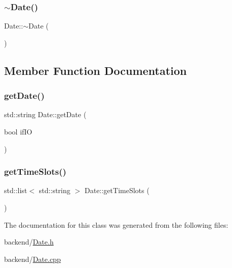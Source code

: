 \mbox{\label{class_date_ade4b469433b7966cc034cbcc6799233b}} 
\subsubsection{\texorpdfstring{$\sim$\+Date()}{~Date()}}
{\footnotesize\ttfamily Date\+::$\sim$\+Date (\begin{DoxyParamCaption}{ }\end{DoxyParamCaption})}



\subsection{Member Function Documentation}
\mbox{\label{class_date_a7de54a65cdd67cf300212b31cdc3d8ee}} 
\subsubsection{\texorpdfstring{get\+Date()}{getDate()}}
{\footnotesize\ttfamily std\+::string Date\+::get\+Date (\begin{DoxyParamCaption}\item[{bool}]{if\+IO }\end{DoxyParamCaption})}

\mbox{\label{class_date_acfcdabd01984684dabbe544163a4b35b}} 
\subsubsection{\texorpdfstring{get\+Time\+Slots()}{getTimeSlots()}}
{\footnotesize\ttfamily std\+::list$<$ std\+::string $>$ Date\+::get\+Time\+Slots (\begin{DoxyParamCaption}{ }\end{DoxyParamCaption})}



The documentation for this class was generated from the following files\+:\begin{DoxyCompactItemize}
\item 
backend/\mbox{\hyperlink{_date_8h}{Date.\+h}}\item 
backend/\mbox{\hyperlink{_date_8cpp}{Date.\+cpp}}\end{DoxyCompactItemize}
